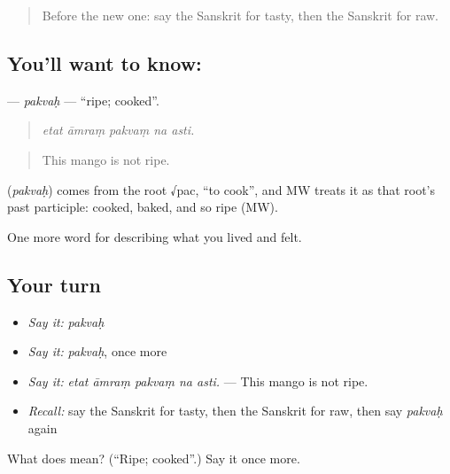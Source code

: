 \begin{quote}
Before the new one: say the Sanskrit for tasty, then the Sanskrit for raw.
\end{quote}

\subsection*{You'll want to know: }
\textbf{} — \emph{pakvaḥ} — \textquotedblleft{}ripe; cooked\textquotedblright{}.

\begin{quote}
    
\end{quote}

\begin{quote}
\emph{etat āmraṃ pakvaṃ na asti.}
\end{quote}

\begin{quote}
This mango is not ripe.
\end{quote}

\begin{cousinweb}
\textbf{} (\emph{pakvaḥ}) comes from the root √pac, \textquotedblleft{}to cook\textquotedblright{}, and MW treats it as that root's past participle: cooked, baked, and so ripe (MW).
\end{cousinweb}

\begin{grammarlens}[title={What you've built}]
One more word for describing what you lived and felt.
\end{grammarlens}

\subsection*{Your turn}
\begin{itemize}
\raggedright
  \item \emph{Say it:} \emph{pakvaḥ}
  \item \emph{Say it:} \emph{pakvaḥ}, once more
  \item \emph{Say it:} \emph{etat āmraṃ pakvaṃ na asti.} — This mango is not ripe.
  \item \emph{Recall:} say the Sanskrit for tasty, then the Sanskrit for raw, then say \emph{pakvaḥ} again
\end{itemize}

\begin{tcolorbox}[breakable,colback=teal!4,colframe=teal!35!black,title={Before you move on}]
What does  mean? (\textquotedblleft{}Ripe; cooked\textquotedblright{}.) Say it once more.
\end{tcolorbox}
